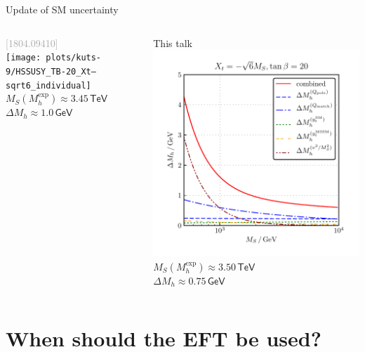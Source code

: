 \documentclass[hyperref={pdfpagelabels=false},ngerman]{beamer}
\newcommand{\eh}[1]{\,\mathsf{#1}}
\newcommand{\GeV}{\eh{GeV}}
\newcommand{\TeV}{\eh{TeV}}
\newcommand{\MS}{\ensuremath{M_S}}
\newcommand{\bigcite}[1]{\textcolor{darkgray}{[#1]}}
\begin{document}
\begin{frame}{Update of SM uncertainty}
  \begin{columns}
    \begin{column}{0.5\textwidth}
      \centering
      \bigcite{1804.09410}\\
      \texttt{[image: plots/kuts-9/HSSUSY\_TB-20\_Xt--sqrt6\_individual]}\\
      $\MS(M_h^{\text{exp}}) \approx 3.45\TeV$\\
      $\Delta M_h \approx 1.0\GeV$
    \end{column}
    \begin{column}{0.5\textwidth}
      \centering
      This talk\\
      \includegraphics[width=\textwidth]{plots/kuts-10/DMh_MS_individual}\\
      $\MS(M_h^{\text{exp}}) \approx 3.50\TeV$\\
      $\Delta M_h \approx 0.75\GeV$
    \end{column}
  \end{columns}
\end{frame}

\section{When should the EFT be used?}
\end{document}
